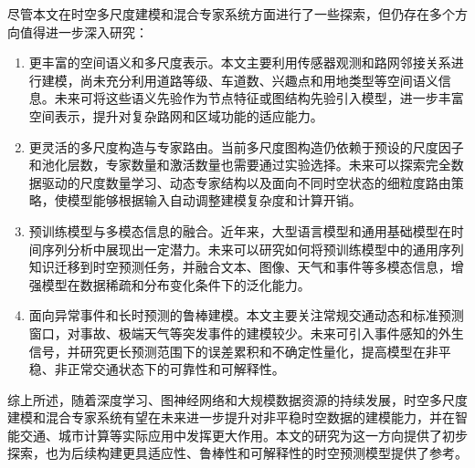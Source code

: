 尽管本文在时空多尺度建模和混合专家系统方面进行了一些探索，但仍存在多个方向值得进一步深入研究：

\begin{enumerate}
    \item 更丰富的空间语义和多尺度表示。本文主要利用传感器观测和路网邻接关系进行建模，尚未充分利用道路等级、车道数、兴趣点和用地类型等空间语义信息。未来可将这些语义先验作为节点特征或图结构先验引入模型，进一步丰富空间表示，提升对复杂路网和区域功能的适应能力。

    \item 更灵活的多尺度构造与专家路由。当前多尺度图构造仍依赖于预设的尺度因子和池化层数，专家数量和激活数量也需要通过实验选择。未来可以探索完全数据驱动的尺度数量学习、动态专家结构以及面向不同时空状态的细粒度路由策略，使模型能够根据输入自动调整建模复杂度和计算开销。

    \item 预训练模型与多模态信息的融合。近年来，大型语言模型和通用基础模型在时间序列分析中展现出一定潜力。未来可以研究如何将预训练模型中的通用序列知识迁移到时空预测任务，并融合文本、图像、天气和事件等多模态信息，增强模型在数据稀疏和分布变化条件下的泛化能力。

    \item 面向异常事件和长时预测的鲁棒建模。本文主要关注常规交通动态和标准预测窗口，对事故、极端天气等突发事件的建模较少。未来可引入事件感知的外生信号，并研究更长预测范围下的误差累积和不确定性量化，提高模型在非平稳、非正常交通状态下的可靠性和可解释性。
\end{enumerate}

综上所述，随着深度学习、图神经网络和大规模数据资源的持续发展，时空多尺度建模和混合专家系统有望在未来进一步提升对非平稳时空数据的建模能力，并在智能交通、城市计算等实际应用中发挥更大作用。本文的研究为这一方向提供了初步探索，也为后续构建更具适应性、鲁棒性和可解释性的时空预测模型提供了参考。
